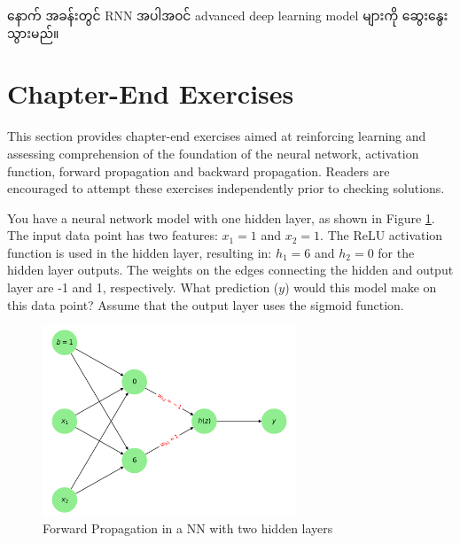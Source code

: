 
နောက် အခန်းတွင် RNN အပါအ၀င် advanced deep learning model များကို ဆွေးနွေးသွားမည်။ 

\newpage

\section{Chapter-End Exercises}\label{sec:exercises}

This section provides chapter-end exercises aimed at reinforcing learning and assessing comprehension of the foundation of the neural network, activation function, forward propagation and backward propagation. Readers are encouraged to attempt these exercises independently prior to checking solutions.

\begin{question}
You have a neural network model with one hidden layer, as shown in Figure \ref{fig:Ex2-1}. The input data point has two features: $x_1=1$ and $x_2 = 1$. The ReLU activation function is used in the hidden layer, resulting in: $h_1 = 6$ and $h_2=0$ for the hidden layer outputs. The weights on the edges connecting the hidden and output layer are -1 and 1, respectively. What prediction ($y$) would this model make on this data point? Assume that the output layer uses the sigmoid function.
\end{question} 

\vspace{0.5em}
\begin{figure}[h]%
\centering
\includegraphics[width=0.675\textwidth]{imgs/chap2_ex1.png}
\caption{Forward Propagation in a NN with two hidden layers}\label{fig:Ex2-1}
\end{figure}

